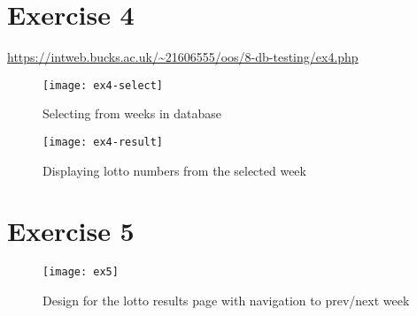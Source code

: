 \clearpage
\section{Exercise 4}

\url{https://intweb.bucks.ac.uk/~21606555/oos/8-db-testing/ex4.php}

\captionsetup{type=figure}


\begin{figure}[H]
  \caption{Selecting from weeks in database}
  \centering
  \texttt{[image: ex4-select]}
\end{figure}

\begin{figure}[H]
  \caption{Displaying lotto numbers from the selected week}
  \centering
  \texttt{[image: ex4-result]}
\end{figure}

\clearpage
\section{Exercise 5}

\begin{figure}[H]
  \caption{Design for the lotto results page with navigation to prev/next week}
  \centering
  \texttt{[image: ex5]}
\end{figure}
